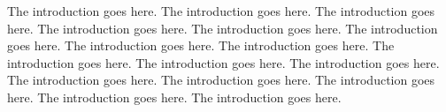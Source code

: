 The introduction goes here.
The introduction goes here.
The introduction goes here.
The introduction goes here.
The introduction goes here.
The introduction goes here.
The introduction goes here.
The introduction goes here.
The introduction goes here.
The introduction goes here.
The introduction goes here.
The introduction goes here.
The introduction goes here.
The introduction goes here.
The introduction goes here.
The introduction goes here.
